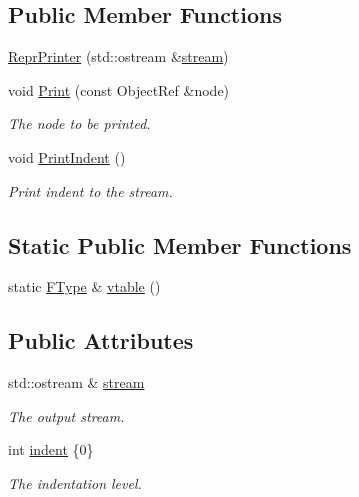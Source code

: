 \subsection*{Public Member Functions}
\begin{DoxyCompactItemize}
\item 
\hyperlink{classtvm_1_1ReprPrinter_a05b878a528f2dec33e28278b17ddeb6b}{Repr\+Printer} (std\+::ostream \&\hyperlink{classtvm_1_1ReprPrinter_a036409dcdcf6f0ac5c6d7d27ec60ed94}{stream})
\item 
void \hyperlink{classtvm_1_1ReprPrinter_a01e320b8f3db86141771dfa0aa7ed389}{Print} (const Object\+Ref \&node)
\begin{DoxyCompactList}\small\item\em The node to be printed. \end{DoxyCompactList}\item 
void \hyperlink{classtvm_1_1ReprPrinter_a9c5941e7c4e24c9880dbd340cc226bf4}{Print\+Indent} ()
\begin{DoxyCompactList}\small\item\em Print indent to the stream. \end{DoxyCompactList}\end{DoxyCompactItemize}
\subsection*{Static Public Member Functions}
\begin{DoxyCompactItemize}
\item 
static \hyperlink{classtvm_1_1ReprPrinter_aee843a9a8b4885f5797843bed6467415}{F\+Type} \& \hyperlink{classtvm_1_1ReprPrinter_ace33744d3c98c545d490d37113103677}{vtable} ()
\end{DoxyCompactItemize}
\subsection*{Public Attributes}
\begin{DoxyCompactItemize}
\item 
std\+::ostream \& \hyperlink{classtvm_1_1ReprPrinter_a036409dcdcf6f0ac5c6d7d27ec60ed94}{stream}
\begin{DoxyCompactList}\small\item\em The output stream. \end{DoxyCompactList}\item 
int \hyperlink{classtvm_1_1ReprPrinter_ae39b784d74fbac5576f48abc37885db0}{indent} \{0\}
\begin{DoxyCompactList}\small\item\em The indentation level. \end{DoxyCompactList}\end{DoxyCompactItemize}


